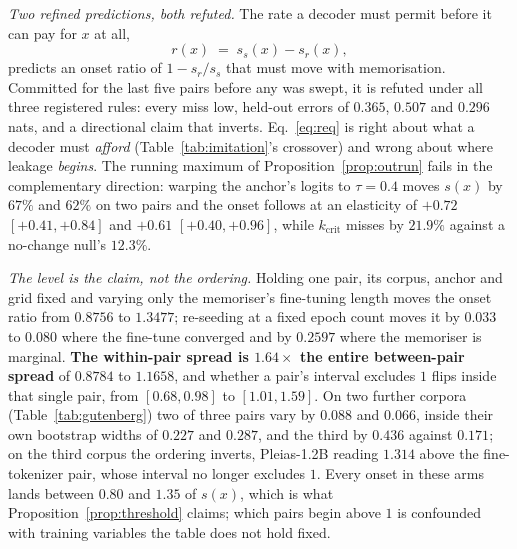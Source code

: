 \emph{Two refined predictions, both refuted.} The rate a decoder must permit before it can pay for $x$
at all,
\begin{equation}
r(x) \;=\; s_s(x) - s_r(x),
\label{eq:req}
\end{equation}
predicts an onset ratio of $1 - s_r/s_s$ that must move with memorisation. Committed for the last five
pairs before any was swept, it is refuted under all three registered rules: every miss low, held-out errors
of $0.365$, $0.507$ and $0.296$ nats, and a directional claim that inverts. Eq.~\eqref{eq:req} is right
about what a decoder must \emph{afford} (Table~\ref{tab:imitation}'s crossover) and wrong about where
leakage \emph{begins}. The running maximum of Proposition~\ref{prop:outrun} fails in the complementary
direction: warping the anchor's logits to $\tau = 0.4$ moves $s(x)$ by $67\%$ and $62\%$ on two pairs and
the onset follows at an elasticity of $+0.72$ $[+0.41, +0.84]$ and $+0.61$ $[+0.40, +0.96]$, while
$k_{\mathrm{crit}}$ misses by $21.9\%$ against a no-change null's $12.3\%$.

\emph{The level is the claim, not the ordering.}\label{app:collapse} Holding one pair, its corpus, anchor
and grid fixed and varying only the memoriser's fine-tuning length moves the onset ratio from $0.8756$ to
$1.3477$; re-seeding at a fixed epoch count moves it by $0.033$ to $0.080$ where the fine-tune converged
and by $0.2597$ where the memoriser is marginal. \textbf{The within-pair spread is $1.64\times$ the entire
between-pair spread} of $0.8784$ to $1.1658$, and whether a pair's interval excludes $1$ flips inside that
single pair, from $[0.68, 0.98]$ to $[1.01, 1.59]$. On two further corpora (Table~\ref{tab:gutenberg}) two
of three pairs vary by $0.088$ and $0.066$, inside their own bootstrap widths of $0.227$ and $0.287$, and
the third by $0.436$ against $0.171$; on the third corpus the ordering inverts, Pleias-1.2B reading $1.314$
above the fine-tokenizer pair, whose interval no longer excludes $1$. Every onset in these arms lands
between $0.80$ and $1.35$ of $s(x)$, which is what Proposition~\ref{prop:threshold} claims; which pairs
begin above $1$ is confounded with training variables the table does not hold fixed.

